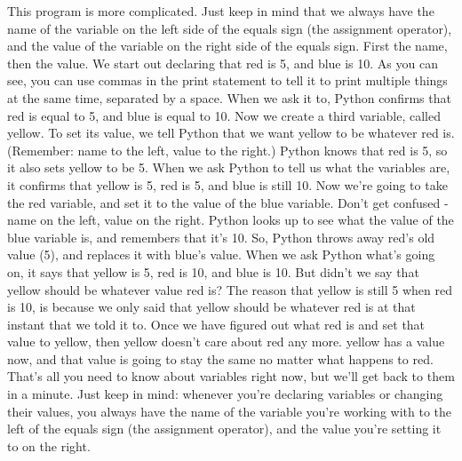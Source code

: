 This program is more complicated. Just keep in mind that we always have the name
of the variable on the left side of the equals sign (the assignment operator),
and the value of the variable on the right side of the equals sign. First the
name, then the value.  We start out declaring that red is 5, and blue is 10. As
you can see, you can use commas in the print statement to tell it to print
multiple things at the same time, separated by a space. When we ask it to,
Python confirms that red is equal to 5, and blue is equal to 10.  Now we create
a third variable, called yellow. To set its value, we tell Python that we want
yellow to be whatever red is. (Remember: name to the left, value to the right.)
Python knows that red is 5, so it also sets yellow to be 5. When we ask Python
to tell us what the variables are, it confirms that yellow is 5, red is 5, and
blue is still 10.
Now we're going to take the red variable, and set it to the value of the blue
variable. Don't get confused - name on the left, value on the right.
Python looks up to see what the value of the blue variable is, and remembers
that it's 10. So, Python throws away red's old value (5), and replaces it with
blue's value. When we ask Python what's going on, it says that yellow is 5, red
is 10, and blue is 10.  But didn't we say that yellow should be whatever value
red is? The reason that yellow is still 5 when red is 10, is because we only
said that yellow should be whatever red is at that instant that we told it to.
Once we have figured out what red is and set that value to yellow, then yellow
doesn't care about red any more. yellow has a value now, and that value is going
to stay the same no matter what happens to red.  That's all you need to know
about variables right now, but we'll get back to them in a minute. Just keep in
mind: whenever you're declaring variables or changing their values, you always
have the name of the variable you're working with to the left of the equals sign
(the assignment operator), and the value you're setting it to on the right.
